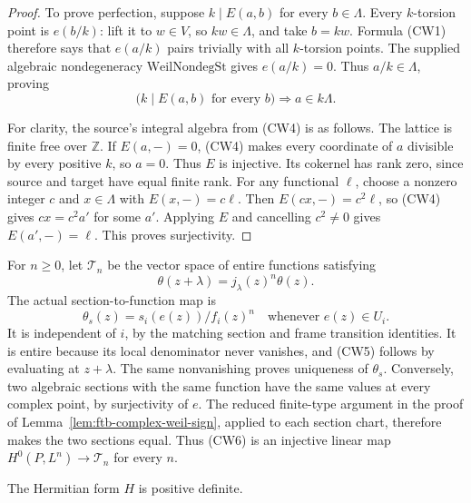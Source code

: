 \begin{proof}
To prove perfection, suppose \(k\mid E(a,b)\) for every \(b\in\Lambda\).
Every \(k\)-torsion point is \(e(b/k)\): lift it to \(w\in V\), so
\(kw\in\Lambda\), and take \(b=kw\).
Formula (CW1) therefore says that \(e(a/k)\) pairs trivially with
all \(k\)-torsion points.  The supplied algebraic nondegeneracy
\(\mathrm{WeilNondegSt}\) gives \(e(a/k)=0\).
Thus \(a/k\in\Lambda\), proving
\[
 \bigl(k\mid E(a,b)\text{ for every }b\bigr)
                            \Longrightarrow a\in k\Lambda. \tag{CW4}
\]

For clarity, the source's integral algebra from (CW4) is as follows.
The lattice is finite free over \(\mathbb Z\).
If \(E(a,-)=0\), (CW4) makes every coordinate of \(a\) divisible
by every positive \(k\), so \(a=0\).  Thus \(E\) is injective.
Its cokernel has rank zero, since source and target have equal
finite rank.  For any functional \(\ell\), choose a nonzero integer
\(c\) and \(x\in\Lambda\) with \(E(x,-)=c\ell\).
Then \(E(cx,-)=c^2\ell\), so (CW4) gives \(cx=c^2a'\) for some
\(a'\).  Applying \(E\) and cancelling \(c^2\ne0\) gives
\(E(a',-)=\ell\).  This proves surjectivity.
\end{proof}

For \(n\geq0\), let \(\mathcal T_n\) be the vector space of entire
functions satisfying
\[
                    \theta(z+\lambda)=j_\lambda(z)^n\theta(z).
                                                                    \tag{CW5}
\]
The actual section-to-function map is
\[
            \theta_s(z)=s_i(e(z))/f_i(z)^n
                         \quad\text{whenever }e(z)\in U_i. \tag{CW6}
\]
It is independent of \(i\), by the matching section and frame
transition identities.  It is entire because its local denominator
never vanishes, and (CW5) follows by evaluating at \(z+\lambda\).
The same nonvanishing proves uniqueness of \(\theta_s\).
Conversely, two algebraic sections with the same function have the
same values at every complex point, by surjectivity of \(e\).
The reduced finite-type argument in the proof of
Lemma~\ref{lem:ftb-complex-weil-sign}, applied to each section chart,
therefore makes the two sections equal.  Thus (CW6) is an injective
linear map \(H^0(P,L^n)\to\mathcal T_n\) for every \(n\).

\begin{srlemma}
\label{lem:ftb-complex-theta-positivity}
The Hermitian form \(H\) is positive definite.
\end{srlemma}


